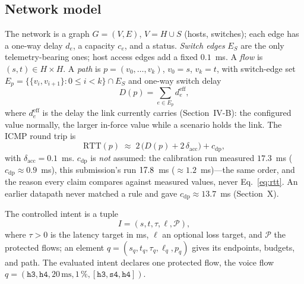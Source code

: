 \documentclass[conference]{IEEEtran}
\begin{document}
\subsection{Network model}
The network is a graph $G=(V,E)$, $V=H\cup S$ (hosts, switches); each edge
has a one-way delay $d_e$, a capacity $c_e$, and a status. \emph{Switch
edges} $E_S$ are the only telemetry-bearing ones; host access edges add a
fixed $0.1$~ms. A \emph{flow} is $(s,t)\in H\times H$. A \emph{path} is
$p=(v_0,\dots,v_k)$, $v_0=s$, $v_k=t$, with switch-edge set
$E_p=\bigl\{\{v_i,v_{i+1}\}:0\le i<k\bigr\}\cap E_S$ and one-way
switch delay
\begin{equation}
D(p)=\sum_{e\in E_p} d^{\mathrm{eff}}_e ,
\label{eq:delay}
\end{equation}
where $d^{\mathrm{eff}}_e$ is the delay the link currently carries
(Section~IV-B): the configured value normally, the larger in-force value
while a scenario holds the link. The ICMP round trip is
\begin{equation}
\mathrm{RTT}(p)\;\approx\;2\,\bigl(D(p)+2\,\delta_{\mathrm{acc}}\bigr)
+c_{\mathrm{dp}},
\label{eq:rtt}
\end{equation}
with $\delta_{\mathrm{acc}}=0.1$~ms. $c_{\mathrm{dp}}$ is \emph{not}
assumed: the calibration run measured $17.3$~ms ($c_{\mathrm{dp}}\approx
0.9$~ms), this submission's run $17.8$~ms ($\approx1.2$~ms)---the
same order, and the reason every claim compares against measured values,
never Eq.~\eqref{eq:rtt}. An earlier datapath never matched a rule and gave
$c_{\mathrm{dp}}\approx 13.7$~ms (Section~X).

The controlled intent is a tuple
\begin{equation}
I=(s,t,\tau,\ell,\mathcal{P}),
\label{eq:intent}
\end{equation}
where $\tau>0$ is the latency target in ms, $\ell$ an optional loss target,
and $\mathcal{P}$ the protected flows; an element $q=(s_q,t_q,\tau_q,
\ell_q,p_q)$ gives its endpoints, budgets, and path. The evaluated intent
declares one protected flow, the voice flow $q=(\texttt{h3},\texttt{h4},
20\,\mathrm{ms},1\,\%,[\texttt{h3},\texttt{s4},\texttt{h4}])$.
\end{document}
